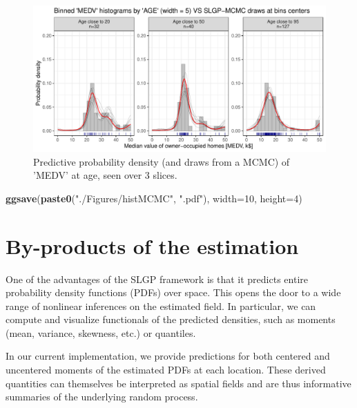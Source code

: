 \documentclass[
]{article}
\newenvironment{Shaded}{\begin{snugshade}}{\end{snugshade}}
\newcommand{\AttributeTok}[1]{\textcolor[rgb]{0.13,0.29,0.53}{#1}}
\newcommand{\DecValTok}[1]{\textcolor[rgb]{0.00,0.00,0.81}{#1}}
\newcommand{\FunctionTok}[1]{\textcolor[rgb]{0.13,0.29,0.53}{\textbf{#1}}}
\newcommand{\NormalTok}[1]{#1}
\newcommand{\StringTok}[1]{\textcolor[rgb]{0.31,0.60,0.02}{#1}}
\begin{document}
\begin{figure}[H]

{\centering \includegraphics{IntroductionSLGP_files/figure-latex/SLGPMCMCplot-1} 

}

\caption{Predictive probability density (and draws from a MCMC) of 'MEDV' at age, seen over 3 slices.}\label{fig:SLGPMCMCplot}
\end{figure}

\begin{Shaded}
\begin{Highlighting}[]
\FunctionTok{ggsave}\NormalTok{(}\FunctionTok{paste0}\NormalTok{(}\StringTok{"./Figures/histMCMC"}\NormalTok{,  }\StringTok{".pdf"}\NormalTok{), }\AttributeTok{width=}\DecValTok{10}\NormalTok{, }\AttributeTok{height=}\DecValTok{4}\NormalTok{)}
\end{Highlighting}
\end{Shaded}

\section{By-products of the estimation}\label{by-products-of-the-estimation}

One of the advantages of the SLGP framework is that it predicts entire probability density functions (PDFs) over space. This opens the door to a wide range of nonlinear inferences on the estimated field. In particular, we can compute and visualize functionals of the predicted densities, such as moments (mean, variance, skewness, etc.) or quantiles.

In our current implementation, we provide predictions for both centered and uncentered moments of the estimated PDFs at each location. These derived quantities can themselves be interpreted as spatial fields and are thus informative summaries of the underlying random process.
\end{document}
